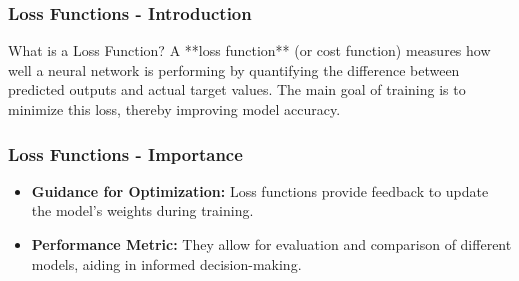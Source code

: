 \documentclass[aspectratio=169]{beamer}
\begin{document}
\begin{frame}[fragile]
    \frametitle{Loss Functions - Introduction}
    \begin{block}{What is a Loss Function?}
        A **loss function** (or cost function) measures how well a neural network is performing by quantifying the difference between predicted outputs and actual target values. The main goal of training is to minimize this loss, thereby improving model accuracy.
    \end{block}
\end{frame}

\begin{frame}[fragile]
    \frametitle{Loss Functions - Importance}
    \begin{itemize}
        \item \textbf{Guidance for Optimization:} Loss functions provide feedback to update the model's weights during training.
        \item \textbf{Performance Metric:} They allow for evaluation and comparison of different models, aiding in informed decision-making.
    \end{itemize}
\end{frame}
\end{document}
